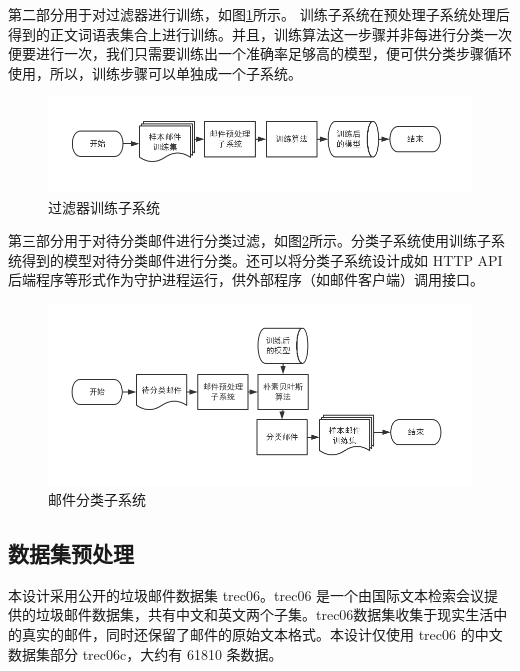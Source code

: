 \documentclass[UTF8,zihao=-4]{ctexart}
\begin{document}
	第二部分用于对过滤器进行训练，如图\ref{fig:train-system}所示。
	训练子系统在预处理子系统处理后得到的正文词语表集合上进行训练。并且，训练算法这一步骤并非每进行分类一次便要进行一次，我们只需要训练出一个准确率足够高的模型，便可供分类步骤循环使用，所以，训练步骤可以单独成一个子系统。
	\begin{figure}[H]
		\centering
		\setlength{\abovecaptionskip}{0.cm}
		\setlength{\belowcaptionskip}{-0.cm}
		\includegraphics[scale=0.45]{pictures/邮件训练子系统.png}
		\caption{过滤器训练子系统}
		\label{fig:train-system}
	\end{figure}
		
	第三部分用于对待分类邮件进行分类过滤，如图\ref{fig:predict-system}所示。分类子系统使用训练子系统得到的模型对待分类邮件进行分类。还可以将分类子系统设计成如 HTTP API 后端程序等形式作为守护进程运行，供外部程序（如邮件客户端）调用接口。
	\begin{figure}[H]
		\centering
		\setlength{\abovecaptionskip}{0.cm}
		\setlength{\belowcaptionskip}{-0.cm}	
		\includegraphics[scale=0.45]{pictures/邮件分类子系统.png}
		\caption{邮件分类子系统}
		\label{fig:predict-system}
	\end{figure}


\subsection{数据集预处理}
	本设计采用公开的垃圾邮件数据集  trec06。trec06 是一个由国际文本检索会议提供的垃圾邮件数据集，共有中文和英文两个子集。trec06数据集收集于现实生活中的真实的邮件，同时还保留了邮件的原始文本格式。本设计仅使用 trec06 的中文数据集部分 trec06c，大约有 61810 条数据。
\end{document}
